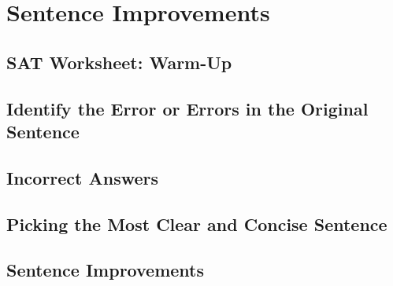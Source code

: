 \chapter{Sentence Improvements}

\section{SAT Worksheet: Warm-Up}
\section{Identify the Error or Errors in the Original Sentence}
\section{Incorrect Answers}
\section{Picking the Most Clear and Concise Sentence}
\section{Sentence Improvements}